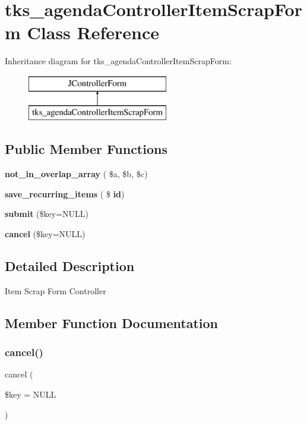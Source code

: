 \section{tks\+\_\+agenda\+Controller\+Item\+Scrap\+Form Class Reference}
\label{classtks__agenda_controller_item_scrap_form}
Inheritance diagram for tks\+\_\+agenda\+Controller\+Item\+Scrap\+Form\+:\begin{figure}[H]
\begin{center}
\leavevmode
\includegraphics[height=2.000000cm]{classtks__agenda_controller_item_scrap_form}
\end{center}
\end{figure}
\subsection*{Public Member Functions}
\begin{DoxyCompactItemize}
\item 
\textbf{ not\+\_\+in\+\_\+overlap\+\_\+array} ( \$a, \$b, \$c)
\item 
\textbf{ save\+\_\+recurring\+\_\+items} ( \$\textbf{ id})
\item 
\textbf{ submit} (\$key=N\+U\+LL)
\item 
\textbf{ cancel} (\$key=N\+U\+LL)
\end{DoxyCompactItemize}


\subsection{Detailed Description}
Item Scrap Form Controller 

\subsection{Member Function Documentation}
\mbox{\label{classtks__agenda_controller_item_scrap_form_aaa0353be19ab28c40ee7af29c7763266}} 
\subsubsection{cancel()}
{\footnotesize\ttfamily cancel (\begin{DoxyParamCaption}\item[{}]{\$key = {\ttfamily NULL} }\end{DoxyParamCaption})}

